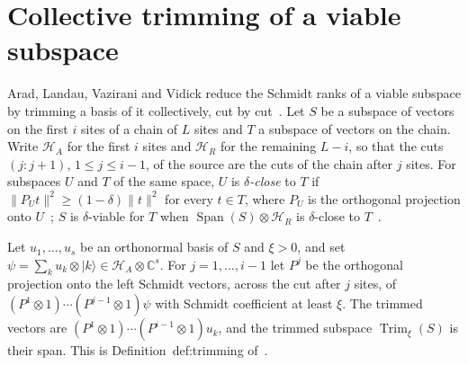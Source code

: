 \section{Collective trimming of a viable subspace}
\label{sec:alvv_collective_trimming}

Arad, Landau, Vazirani and Vidick reduce the Schmidt ranks of a viable
subspace by trimming a basis of it collectively, cut by
cut~\cite[lines 642--697]{Arad2016RigorousRG}. Let $S$ be a subspace of
vectors on the first $i$ sites of a chain of $L$ sites and $T$ a subspace of
vectors on the chain. Write $\mathcal H_A$ for the first $i$ sites and
$\mathcal H_R$ for the remaining $L-i$, so that the cuts $(j:j+1)$,
$1\le j\le i-1$, of the source are the cuts of the chain after $j$ sites.
For subspaces $U$ and $T$ of the same space, $U$ is \emph{$\delta$-close} to
$T$ if $\|P_Ut\|^2\ge(1-\delta)\|t\|^2$ for every $t\in T$, where $P_U$ is the
orthogonal projection onto $U$~\cite[``Closeness'']{QICLean2026Blueprint};
$S$ is $\delta$-viable for $T$ when
$\operatorname{Span}(S)\otimes\mathcal H_R$ is $\delta$-close to
$T$~\cite[lines 433--440]{Arad2016RigorousRG}.

\begin{definition}
    \label{def:alvv_collective_trim}
    \leanok
    Let $u_1,\dots,u_s$ be an orthonormal basis of $S$ and $\xi>0$, and set
    $\psi=\sum_k u_k\otimes|k\rangle\in\mathcal H_A\otimes\mathbb C^s$. For
    $j=1,\dots,i-1$ let $P^j$ be the orthogonal projection onto the left
    Schmidt vectors, across the cut after $j$ sites, of
    $(P^1\otimes1)\cdots(P^{j-1}\otimes1)\psi$ with Schmidt coefficient at
    least $\xi$. The trimmed vectors are
    $(P^1\otimes1)\cdots(P^{i-1}\otimes1)u_k$, and the trimmed subspace
    $\operatorname{Trim}_\xi(S)$ is their span. This is
    Definition~def:trimming of~\cite[lines 642--656]{Arad2016RigorousRG}.
\end{definition}

